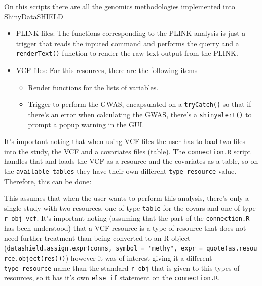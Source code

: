 \documentclass[
]{book}
\newenvironment{Shaded}{\begin{snugshade}}{\end{snugshade}}
\newcommand{\NormalTok}[1]{#1}
\newcommand{\OperatorTok}[1]{\textcolor[rgb]{0.81,0.36,0.00}{\textbf{#1}}}
\newcommand{\StringTok}[1]{\textcolor[rgb]{0.31,0.60,0.02}{#1}}
\providecommand{\tightlist}{%
  \setlength{\itemsep}{0pt}\setlength{\parskip}{0pt}}
\begin{document}
On this scripts there are all the genomics methodologies implemented into ShinyDataSHIELD

\begin{itemize}
\tightlist
\item
  PLINK files: The functions corresponding to the PLINK analysis is just a trigger that reads the inputed command and performs the querry and a \texttt{renderText()} function to render the raw text output from the PLINK.
\item
  VCF files: For this resources, there are the following items

  \begin{itemize}
  \tightlist
  \item
    Render functions for the lists of variables.
  \item
    Trigger to perform the GWAS, encapsulated on a \texttt{tryCatch()} so that if there's an error when calculating the GWAS, there's a \texttt{shinyalert()} to prompt a popup warning in the GUI.
  \end{itemize}
\end{itemize}

It's important noting that when using VCF files the user has to load two files into the study, the VCF and a covariates files (table). The \texttt{connection.R} script handles that and loads the VCF as a resource and the covariates as a table, so on the \texttt{available\_tables} they have their own different \texttt{type\_resource} value. Therefore, this can be done:

\begin{Shaded}
\end{Shaded}

This assumes that when the user wants to perform this analysis, there's only a single study with two resources, one of type \texttt{table} for the covars and one of type \texttt{r\_obj\_vcf}. It's important noting (assuming that the part of the \texttt{connection.R} has been understood) that a VCF resource is a type of resource that does not need further treatment than being converted to an R object (\texttt{datashield.assign.expr(conns,\ symbol\ =\ "methy",\ expr\ =\ quote(as.resource.object(res)))}) however it was of interest giving it a different \texttt{type\_resource} name than the standard \texttt{r\_obj} that is given to this types of resources, so it has it's own \texttt{else\ if} statement on the \texttt{connection.R}.
\end{document}
